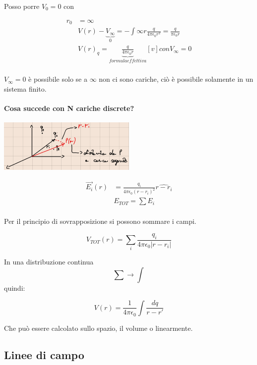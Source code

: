 \documentclass{book}
\begin{document}
Posso porre $V_0 = 0$ con 

\[
\begin{split}
r_0 &= \infty \\
&V(r) - \underbrace{V_{\infty}}_0 = -\int{\infty}{r} \frac{q}{4\pi \epsilon_0 r^2} = \frac{q}{\pi \epsilon_0 r} \\
&V(r)_q = \underbrace{\frac{q}{4\pi \epsilon_0 r}}_{formula effettiva} [v] con V_{\infty} = 0 \\
\end{split}
\]

$V_{\infty} = 0$ è possibile solo se a $\infty$ non ci sono cariche, ciò è possibile solamente in un sistema finito.  

\paragraph{Cosa succede con N cariche discrete?}

\begin{center}
	\includegraphics[width=0.5\textwidth]{discrete.png}
\end{center} 

\[
\begin{split}
\vec{E_i}(r) &= \frac{q_i}{4\pi \epsilon_0(r - r_i)^2} \hat{r - r_i} \\
&E_{TOT} = \sum E_i \\
\end{split}
\]

Per il principio di sovrapposizione si possono sommare i campi.

\[
V_{TOT}(r) = \sum_i \frac{q_i}{4\pi \epsilon_0 |r - r_i|}
\]

In una distribuzione continua \[\sum \rightarrow \int\] quindi:
\begin{center}
	\[V(r) = \frac{1}{4\pi \epsilon_0} \int\frac{dq}{r-r'}\]
\end{center}

Che può essere calcolato sullo spazio, il volume o linearmente.

\subsection{Linee di campo}
\end{document}
